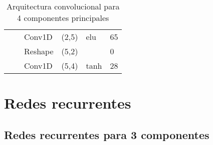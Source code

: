 \begin{table}[H]
\begin{center}
\begin{tabular}{ll|l|l|l|l|}
\multicolumn{1}{|l|}{}                                                                  &                                   & Conv1D                             & (2,5)                                & elu                                     & 65                                          \\ \cline{3-6} 
\multicolumn{1}{|l|}{}                                                                  &                                   & Reshape                            & (5,2)                                &                                          & 0                                           \\ \cline{3-6} 
\multicolumn{1}{|l|}{}                                                                  &                                   & Conv1D                             & (5,4)                                & tanh                                     & 28                                          \\ \hline
\end{tabular}

\end{center}
\caption{Arquitectura convolucional para 4 componentes principales}
\label{table:cnn_4}
\end{table}

\section{Redes recurrentes}


\subsection{Redes recurrentes para 3 componentes}

